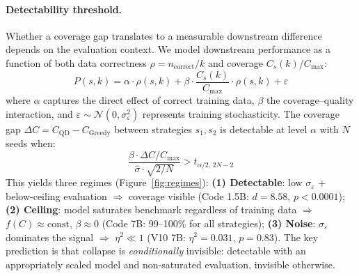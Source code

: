 \documentclass{article}
\begin{document}
\begin{enumerate}[nosep]
\paragraph{Detectability threshold.}
Whether a coverage gap translates to a measurable downstream difference depends on the evaluation context.
We model downstream performance as a function of both data correctness $\rho = n_{\text{correct}}/k$ and coverage $C_s(k)/C_{\max}$:
\begin{equation}
P(s,k) = \alpha \cdot \rho(s,k) + \beta \cdot \frac{C_s(k)}{C_{\max}} \cdot \rho(s,k) + \varepsilon
\label{eq:performance}
\end{equation}
where $\alpha$ captures the direct effect of correct training data, $\beta$ the coverage--quality interaction, and $\varepsilon \sim \mathcal{N}(0, \sigma^2_\varepsilon)$ represents training stochasticity.
The coverage gap $\Delta C = C_{\text{QD}} - C_{\text{Greedy}}$ between strategies $s_1, s_2$ is detectable at level $\alpha$ with $N$ seeds when:
\begin{equation}
\frac{\beta \cdot \Delta C / C_{\max}}{\hat{\sigma} \cdot \sqrt{2/N}} > t_{\alpha/2,\, 2N-2}
\label{eq:detectability}
\end{equation}
This yields three regimes (Figure~\ref{fig:regimes}):
\textbf{(1) Detectable}: low $\sigma_\varepsilon$ + below-ceiling evaluation $\Rightarrow$ coverage visible (Code 1.5B: $d{=}8.58$, $p{<}0.0001$);
\textbf{(2) Ceiling}: model saturates benchmark regardless of training data $\Rightarrow$ $f(C) \approx \text{const}$, $\beta \approx 0$ (Code 7B: 99--100\% for all strategies);
\textbf{(3) Noise}: $\sigma_\varepsilon$ dominates the signal $\Rightarrow$ $\eta^2 \ll 1$ (V10 7B: $\eta^2{=}0.031$, $p{=}0.83$).
The key prediction is that collapse is \emph{conditionally} invisible: detectable with an appropriately scaled model and non-saturated evaluation, invisible otherwise.


\end{enumerate}
\end{document}
